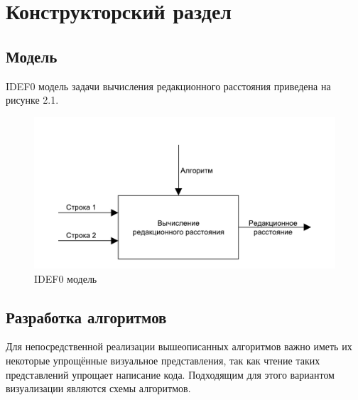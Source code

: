 \chapter{Конструкторский раздел}
\label{cha:design}

\section{Модель}
IDEF0 модель задачи вычисления редакционного расстояния приведена на рисунке 2.1.
\begin{figure}
    \centering
    \includegraphics{pdf/mainIdef0.pdf}
    \caption{IDEF0 модель}
\end{figure}

\section{Разработка алгоритмов}
Для непосредственной реализации вышеописанных алгоритмов важно иметь их некоторые упрощённые визуальное представления, так как чтение таких представлений упрощает написание кода. Подходящим для этого вариантом визуализации являются схемы алгоритмов.

